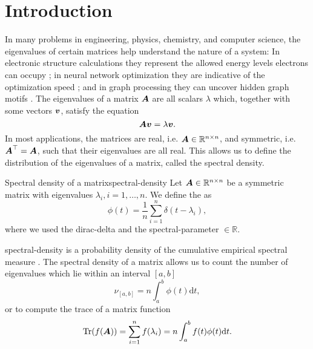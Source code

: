 \chapter{Introduction}
\label{chp:1-introduction}

In many problems in engineering, physics, chemistry, and computer science, 
the eigenvalues of certain matrices help understand the nature of a system:
In electronic structure calculations they represent the allowed energy levels 
electrons can occupy \cite{ducastelle1970charge, haydock1972electronic, lin2017randomized};
in neural network optimization they are indicative of the optimization speed \cite{ghorbani2019investigation,chen2021slq,adepu2021hessian};
and in graph processing they can uncover hidden graph motifs \cite{kruzick2018graph,huang2021kernels,patane2022filter}.
The eigenvalues of a matrix $\boldsymbol{A}$ are all scalars $\lambda$ which, together
with some vectors $\boldsymbol{v}$, satisfy the equation
\begin{equation}
    \boldsymbol{A} \boldsymbol{v} = \lambda \boldsymbol{v}.
    \label{equ:1-introduction-eigenvalue}
\end{equation}
In most applications, the matrices are real, i.e. $\boldsymbol{A} \in \mathbb{R}^{n \times n}$,
and symmetric, i.e. $\boldsymbol{A}^{\top} = \boldsymbol{A}$, such that their eigenvalues are
all real. This allows us to define the distribution of the eigenvalues of a
matrix, called the spectral density.

\begin{definition}{Spectral density of a matrix}{spectral-density}
    Let $\boldsymbol{A} \in \mathbb{R}^{n \times n}$ be a symmetric matrix with eigenvalues $\lambda_i, i=1, \dots, n$.
    We define the  as
    \begin{equation}
        \phi(t) = \frac{1}{n} \sum_{i=1}^{n} \delta(t - \lambda_i),
        \label{equ:1-introduction-def-spectral-density}
    \end{equation}
    where we used the \gls{dirac-delta} \cite[Chapter~15]{dirac1947quantum}
    and the \gls{spectral-parameter} $\in \mathbb{R}$.
\end{definition}

\gls{spectral-density} is a probability density \cite{klenke2013probability}
of the cumulative empirical spectral measure \cite{chen2021slq}.
The spectral density of a matrix allows us to count the number of
eigenvalues which lie within an interval $[a, b]$
\begin{equation}
    \nu_{[a, b]} = n \int_{a}^{b} \phi(t) \mathrm{d}t,
    \label{equ:1-introduction-eigenvalue-counting}
\end{equation}
or to compute the trace of a matrix function \cite{lin2017randomized}
\begin{equation}
    \operatorname{Tr}(f(\boldsymbol{A})) = \sum_{i=1}^n f(\lambda_i) = n \int_{a}^{b} f(t) \phi(t) \mathrm{d}t.
    \label{equ:1-introduction-matrix-trace}
\end{equation}\\

